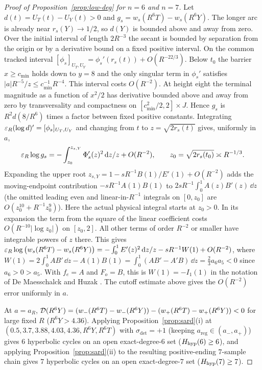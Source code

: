 \begin{proof}[Proof of Proposition~\ref{prop:low-deg} for $n=6$ and $n=7$]
Let $d(t)=U_T(t)-U_Y(t)>0$ and $g_s=w_s(R^6T)-w_s(R^6Y)$.
The longer arc is already near $r_s(Y)\to1/2$, so $d(Y)$ is bounded
above and away from zero. Over the initial interval of length $2R^{-3}$
the secant is bounded by separation from the origin or by a derivative
bound on a fixed positive interval. On the common tracked interval
$[\phi_s]_{U_T,U_Y}=\phi_s'(r_s(t))+O(R^{-22/3})$.
Below $t_0$ the barrier $x\ge c_{\min}$ holds down to $y=8$ and
the only singular term in $\phi_s'$ satisfies
$|a|R^{-5}/z\le c_{\min}^{-1}R^{-4}$. This interval costs $O(R^{-2})$.
At height eight the terminal magnitude as a function of $x^2/2$ has
derivative bounded above and away from zero by transversality and
compactness on $[c_{\min}^2/2,2]\times J$. Hence $g_s$ is $R^2d(8/R^6)$
times a factor between fixed positive constants. Integrating
$\varepsilon_R(\log d)'=[\phi_s]_{U_T,U_Y}$ and changing from $t$ to
$z=\sqrt{2r_s(t)}$ gives, uniformly in $a$,
\[
 \varepsilon_R\log g_s=-\int_{z_0}^{z_{s,Y}}\Phi_s'(z)^2\,\mathrm{d} z/z+O(R^{-2}),
 \qquad z_0=\sqrt{2r_s(t_0)}\asymp R^{-1/3}.
\]
Expanding the upper root $z_{s,Y}=1-sR^{-1}B(1)/E'(1)+O(R^{-2})$ adds the moving-endpoint contribution $-sR^{-1}A(1)B(1)$ to $2sR^{-1}\int_0^1 A(z)B'(z)\,\dd z$ (the omitted leading even and linear-in-$R^{-1}$ integrals on $[0,z_0]$
are $O(z_0^{10}+R^{-1}z_0^9)$). Here the actual physical integral
starts at $z_0>0$. In its expansion the term from the square of the linear
coefficient costs $O(R^{-10}|\log z_0|)$ on $[z_0,2]$.
All other terms of order $R^{-2}$ or smaller have integrable powers of $z$
there. This gives $\varepsilon_R\log\big(w_s(R^6 T)-w_s(R^6 Y)\big)=-\int_0^1 E'(z)^2\,\mathrm{d} z/z - sR^{-1}W(1)+O(R^{-2})$, where $W(1)=2\int_0^1 AB'\,\dd z-A(1)B(1)=\int_0^1(AB'-A'B)\,\dd z=\frac23 a_6 a_5<0$ since $a_6>0>a_5$. With $f_e=A$ and $F_o=B$, this is
$W(1)=-I_1(1)$ in the notation of De Maesschalck and Huzak
\cite[Proposition~1]{DMH2015}. The cutoff estimate above gives the
$O(R^{-2})$ error uniformly in $a$.

At $a=a_R$, $\mathcal{D}(R^6 Y)=(w_-(R^6 T)-w_-(R^6 Y))-(w_+(R^6 T)-w_+(R^6 Y))<0$ for large fixed $R$ ($R^6 Y>4.36$). Applying Proposition~\ref{prop:sard}(i) at $(0.5,3.7,3.88,4.03,4.36,R^6 Y,R^6 T)$ with $\sigma_{\mathrm{det}}=+1$ (keeping $a_{\mathrm{reg}}\in(a_-,a_+)$) gives $6$ hyperbolic cycles on an open exact-degree-$6$ set ($H_{\mathrm{hyp}}(6)\ge 6$), and applying Proposition~\ref{prop:sard}(ii) to the resulting positive-ending $7$-sample chain gives $7$ hyperbolic cycles on an open exact-degree-$7$ set ($H_{\mathrm{hyp}}(7)\ge 7$).
\end{proof}

